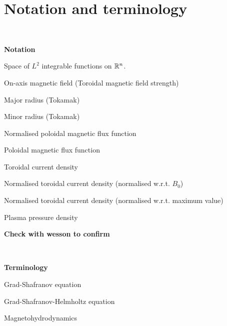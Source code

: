 

\chapter{Notation and terminology}\label{notation}

\renewcommand{\thefootnote}{\fnsymbol{footnote}}


\

\noindent\textbf{Notation}


\newcommand{\nttn}[2]{\item[{\ \makebox[3.18cm][l]{#1}}]{#2}}
\begin{list}{}{ \setlength{\leftmargin}{3.4cm}
                \setlength{\labelwidth}{3.4cm}}

\nttn{$L^2(\R^n)$}{Space of $L^2$ integrable functions on $\mathbb{R}^n$.}

\nttn{$B_0$}{On-axis magnetic field (Toroidal magnetic field strength)}
\nttn{$R_0$}{Major radius (Tokamak)}
\nttn{$a$}{Minor radius (Tokamak)}
\nttn{$\psi$}{Normalised poloidal magnetic flux function}
\nttn{$\Psi$}{Poloidal magnetic flux function}
\nttn{$J_{\phi}$}{Toroidal current density}
\nttn{$j_{\phi}$}{Normalised toroidal current density (normalised w.r.t. $B_0$)}
\nttn{$I_{\rho}$}{Normalised toroidal current density (normalised w.r.t. maximum value)}
\nttn{$p$}{Plasma pressure density}
\nttn{$\beta$}{\textbf{Check with wesson to confirm}}

\end{list}

\

\noindent\textbf{Terminology}


\newcommand{\term}[2]{\item[{\ \makebox[4.58cm][l]{#1}}]{#2}}
\begin{list}{}{ \setlength{\leftmargin}{4.8cm}
                \setlength{\labelwidth}{4.8cm}}


\term{GS}{Grad-Shafranov equation}
\term{GSH}{Grad-Shafranov-Helmholtz equation}
\term{MHD}{Magnetohydrodynamics}


\end{list}
